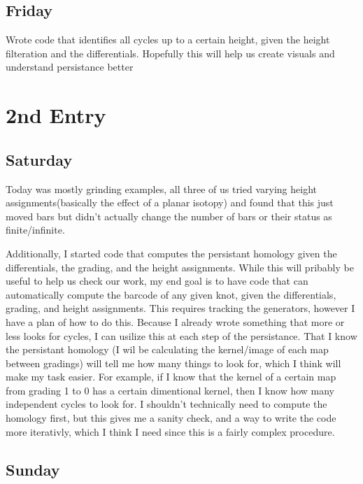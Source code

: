\documentclass[11pt,oneside]{amsart}
\begin{document}
\subsection{Friday}

Wrote code that identifies all cycles up to a certain height, given the height filteration and the differentials. Hopefully this will help us create visuals and understand persistance better


\section{2nd Entry}

\subsection{Saturday}

Today was mostly grinding examples, all three of us tried varying height assignments(basically the effect of a planar isotopy) and found that this just moved bars but didn't actually change the number of bars or their status as finite/infinite. 

Additionally, I started code that computes the persistant homology given the differentials, the grading, and the height assignments. While this will pribably be useful to help us check our work, my end goal is to have code that can automatically compute the barcode of any given knot, given the differentials, grading, and height assignments. This requires tracking the generators, however I have a plan of how to do this. Because I already wrote something that more or less looks for cycles, I can usilize this at each step of the persistance. That I know the persistant homology (I wil be calculating the kernel/image of each map between gradings) will tell me how many things to look for, which I think will make my task easier. For example, if I know that the kernel of a certain map from grading 1 to 0 has a certain dimentional kernel, then I know how many independent cycles to look for. I shouldn't technically need to compute the homology first, but this gives me a sanity check, and a way to write the code more iterativly, which I think I need since this is a fairly complex procedure.





\subsection{Sunday}
\end{document}
